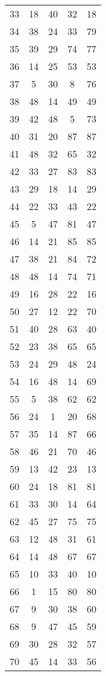 \documentclass[a4paper,10pt,ngerman]{scrartcl}
\begin{document}
\begin{longtable}[c]{c|c|c|c|c}
    33 & 18 & 40 & 32 & 18 \\
    34 & 38 & 24 & 33 & 79 \\
    35 & 39 & 29 & 74 & 77 \\
    36 & 14 & 25 & 53 & 53 \\
    37 & 5 & 30 & 8 & 76 \\
    38 & 48 & 14 & 49 & 49 \\
    39 & 42 & 48 & 5 & 73 \\
    40 & 31 & 20 & 87 & 87 \\
    41 & 48 & 32 & 65 & 32 \\
    42 & 33 & 27 & 83 & 83 \\
    43 & 29 & 18 & 14 & 29 \\
    44 & 22 & 33 & 43 & 22 \\
    45 & 5 & 47 & 81 & 47 \\
    46 & 14 & 21 & 85 & 85 \\
    47 & 38 & 21 & 84 & 72 \\
    48 & 48 & 14 & 74 & 71 \\
    49 & 16 & 28 & 22 & 16 \\
    50 & 27 & 12 & 22 & 70 \\
    51 & 40 & 28 & 63 & 40 \\
    52 & 23 & 38 & 65 & 65 \\
    53 & 24 & 29 & 48 & 24 \\
    54 & 16 & 48 & 14 & 69 \\
    55 & 5 & 38 & 62 & 62 \\
    56 & 24 & 1 & 20 & 68 \\
    57 & 35 & 14 & 87 & 66 \\
    58 & 46 & 21 & 70 & 46 \\
    59 & 13 & 42 & 23 & 13 \\
    60 & 24 & 18 & 81 & 81 \\
    61 & 33 & 30 & 14 & 64 \\
    62 & 45 & 27 & 75 & 75 \\
    63 & 12 & 48 & 31 & 61 \\
    64 & 14 & 48 & 67 & 67 \\
    65 & 10 & 33 & 40 & 10 \\
    66 & 1 & 15 & 80 & 80 \\
    67 & 9 & 30 & 38 & 60 \\
    68 & 9 & 47 & 45 & 59 \\
    69 & 30 & 28 & 32 & 57 \\
    70 & 45 & 14 & 33 & 56 \\

\end{longtable}
\end{document}
